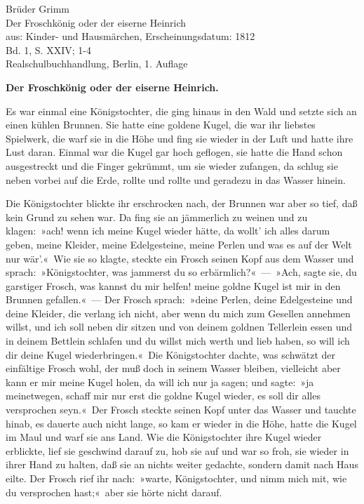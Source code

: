 Brüder Grimm \\
Der Froschkönig oder der eiserne Heinrich \\
aus: Kinder- und Hausmärchen, Erscheinungsdatum: 1812\\
Bd. 1, S. XXIV; 1-4 \\
Realschulbuchhandlung, Berlin, 1. Auflage\bigskip

\textbf{Der Froschkönig oder der eiserne Heinrich.}\bigskip

Es war einmal eine Königstochter, die ging hinaus in den Wald und setzte sich an einen kühlen Brunnen. Sie hatte eine goldene Kugel, die war ihr liebstes Spielwerk, die warf sie in die Höhe und fing sie wieder in der Luft und hatte ihre Lust daran. Einmal war die Kugel gar hoch geflogen, sie hatte die Hand schon ausgestreckt und die Finger gekrümmt, um sie wieder zufangen, da schlug sie neben vorbei auf die Erde, rollte und rollte und geradezu in das Wasser hinein.

Die Königstochter blickte ihr erschrocken nach, der Brunnen war aber so tief, daß kein Grund zu sehen war. Da fing sie an jämmerlich zu weinen und zu klagen: »ach! wenn ich meine Kugel wieder hätte, da wollt’ ich alles darum geben, meine Kleider, meine Edelgesteine, meine Perlen und was es auf der Welt nur wär’.« Wie sie so klagte, steckte ein Frosch seinen Kopf aus dem Wasser und sprach: »Königstochter, was jammerst du so erbärmlich?« — »Ach, sagte sie, du garstiger Frosch, was kannst du mir helfen! meine goldne Kugel ist mir in den Brunnen gefallen.« — Der Frosch sprach: »deine Perlen, deine Edelgesteine und deine Kleider, die verlang ich nicht, aber wenn du mich zum Gesellen annehmen willst, und ich soll neben dir sitzen und von deinem goldnen Tellerlein essen und in deinem Bettlein schlafen und du willst mich werth und lieb haben, so will ich dir deine Kugel wiederbringen.« Die Königstochter dachte, was schwätzt der einfältige Frosch wohl, der muß doch in seinem Wasser bleiben, vielleicht aber kann er mir meine Kugel holen, da will ich nur ja sagen; und sagte: »ja meinetwegen, schaff mir nur erst die goldne Kugel wieder, es soll dir alles versprochen seyn.« Der Frosch steckte seinen Kopf unter das Wasser und tauchte hinab, es dauerte auch nicht lange, so kam er wieder in die Höhe, hatte die Kugel im Maul und warf sie ans Land. Wie die Königstochter ihre Kugel wieder erblickte, lief sie geschwind darauf zu, hob sie auf und war so froh, sie wieder in ihrer Hand zu halten, daß sie an nichts weiter gedachte, sondern damit nach Haus eilte. Der Frosch rief ihr nach: »warte, Königstochter, und nimm mich mit, wie du versprochen hast;« aber sie hörte nicht darauf.

